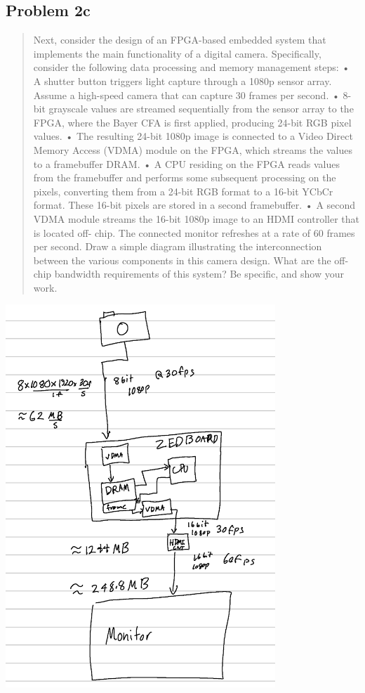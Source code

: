 \documentclass[10pt,a4paper]{article}
\let\oldsubsection\subsection
\renewcommand{\subsection}{%
    \setcounter{equation}{0}%
    \oldsubsection%
}
\begin{document}
\subsection{Problem 2c}
\begin{quote}
Next, consider the design of an FPGA-based embedded system that implements the main functionality of a
digital camera. Specifically, consider the following data processing and memory management steps:
• A shutter button triggers light capture through a 1080p sensor array. Assume a high-speed camera
that can capture 30 frames per second.
• 8-bit grayscale values are streamed sequentially from the sensor array to the FPGA, where the Bayer
CFA is first applied, producing 24-bit RGB pixel values.
• The resulting 24-bit 1080p image is connected to a Video Direct Memory Access (VDMA) module on
the FPGA, which streams the values to a framebuffer DRAM.
• A CPU residing on the FPGA reads values from the framebuffer and performs some subsequent
processing on the pixels, converting them from a 24-bit RGB format to a 16-bit YCbCr format. These
16-bit pixels are stored in a second framebuffer.
• A second VDMA module streams the 16-bit 1080p image to an HDMI controller that is located off-
chip. The connected monitor refreshes at a rate of 60 frames per second.
Draw a simple diagram illustrating the interconnection between the various components in this camera design.
What are the off-chip bandwidth requirements of this system? Be specific, and show your work.

\end{quote}
\begin{center}
\includegraphics[width=4in]{images/Problem2-3.png} \\
\end{center}
\end{document}
